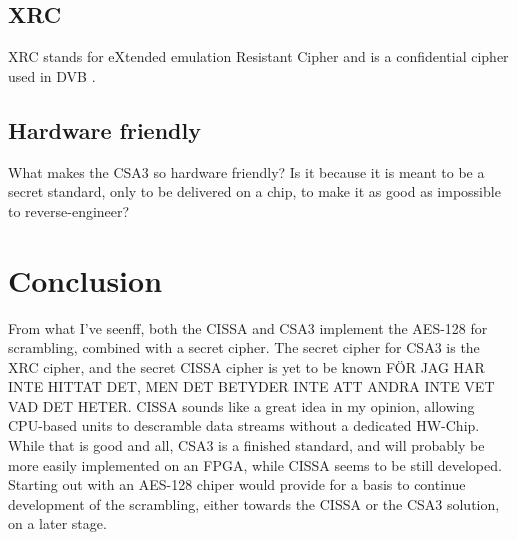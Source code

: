 \subsection{XRC}
XRC stands for eXtended emulation Resistant Cipher and is a confidential cipher 
used in DVB \citep[p. 8]{DVB:2013}.

\subsection{Hardware friendly}
What makes the CSA3 so hardware friendly?
Is it because it is meant to be a secret standard, only to be delivered
on a chip, to make it as good as impossible to reverse-engineer?

\section{Conclusion}
From what I've seenff, both the CISSA and CSA3 implement the AES-128 for 
scrambling, combined with a secret cipher. The secret cipher for CSA3 is the XRC 
cipher, and the secret CISSA cipher is yet to be known FÖR JAG HAR INTE HITTAT DET, MEN DET BETYDER INTE ATT ANDRA INTE VET VAD DET HETER. CISSA sounds like a 
great idea in my opinion, allowing CPU-based units to descramble data streams 
without a dedicated HW-Chip. While that is good and all, CSA3 is a finished 
standard, and will probably be more easily implemented on an FPGA, while CISSA 
seems to be still developed. Starting out with an AES-128 chiper would provide 
for a basis to continue development of the scrambling, either towards the CISSA 
or the CSA3 solution, on a later stage.
